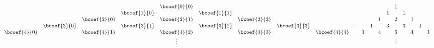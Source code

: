 \[
  \begin{array}{*{9}{c}}
                 &              &              &              &  \bcoef{0}{0} &              &              &              &              \\
                 &              &              & \bcoef{1}{0} &               & \bcoef{1}{1} &              &              &              \\
                 &              & \bcoef{2}{0} &              &  \bcoef{2}{1} &              & \bcoef{2}{2} &              &              \\
                 & \bcoef{3}{0} &              & \bcoef{3}{1} &               & \bcoef{3}{2} &              & \bcoef{3}{3} &              \\
    \bcoef{4}{0} &              & \bcoef{4}{1} &              &  \bcoef{4}{2} &              & \bcoef{4}{3} &              &  \bcoef{4}{4}\\
                 &              &              &              &  \vdots       &              &              &              &              
  \end{array}
  =
  \begin{array}{*{9}{c}}
      &     &     &     &  1  &     &     &     &     \\
      &     &     &  1  &     &  1  &     &     &     \\
      &     &  1  &     &  2  &     &  1  &     &     \\
      &  1  &     &  3  &     &  3  &     &  1  &     \\
    1 &     &  4  &     &  6  &     &  4  &     &  1  \\
      &     &     &     &\vdots&    &     &     &       
  \end{array}
\]

